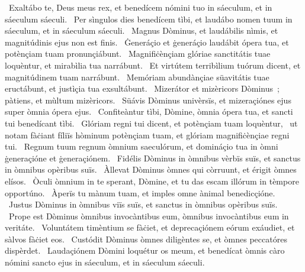 \psalmChapterWithInscription{}
{ }
{%
~Exaltábo te, Deus meus rex, et benedícem nómini tuo in sáeculum, et in sáeculum sáeculi. 
~Per sìngulos dies benedícem tìbi, et laudábo nomen tuum in sáeculum, et in sáeculum sáeculi. 
~Magnus Dòminus, et laudábilis nìmis, et magnitúdinis ejus non est finis. 
~Ġeneráçio et ġeneráçio laudábit ópera tua, et potènçiam tuam pronunçiábunt. 
~Magnifiċènçiam glóriae sanctitátis tuae loquèntur, et mirabìlia tua narrábunt. 
~Et virtútem terribìlium tuórum dicent, et magnitúdinem tuam narrábunt. 
~Memóriam abundànçiae süavitátis tuae eructábunt, et justìçia tua exsultábunt. 
~Mizerátor et mizèricors Dòminus~; pàtiens, et mùltum mizèricors. 
~Süávis Dòminus univèrsïs, et mizeraçiónes ejus super òmnia ópera ejus. 
~Confiteàntur tìbi, Dòmine, òmnia ópera tua, et sancti tui benedícant tìbi. 
~Glóriam regni tui dicent, et potènçiam tuam loquèntur, 
~ut notam fàċiant fíliïs hòminum potènçiam tuam, et glóriam magnifiċènçiae regni tui. 
~Regnum tuum regnum òmnium saeculórum, et domináçio tua in òmni ġeneraçióne et ġeneraçiónem. 
~Fidélis Dòminus in òmnibus vèrbïs suïs, et sanctus in òmnibus opèribus suïs. 
~Àllevat Dòminus òmnes qui còrruunt, et érigit òmnes elísos. 
~Òculi òmnium in te sperant, Dòmine, et tu das escam illórum in tèmpore opportúno. 
~Àperïs tu mànum tuam, et imples omne ànimal benedicçióne. 
~Justus Dòminus in òmnibus viïs suïs, et sanctus in òmnibus opèribus suïs. 
~Prope est Dòminus òmnibus invocàntibus eum, òmnibus invocàntibus eum in veritáte. 
~Voluntátem timèntium se fàċiet, et deprecaçiónem eórum exáudiet, et sàlvos fàċiet eos. 
~Custódit Dòminus òmnes diligèntes se, et òmnes peccatóres dispèrdet. 
~Laudaçiónem Dòmini loquétur os meum, et benedícat òmnis càro nómini sancto ejus in sáeculum, et in sáeculum sáeculi. 
}
